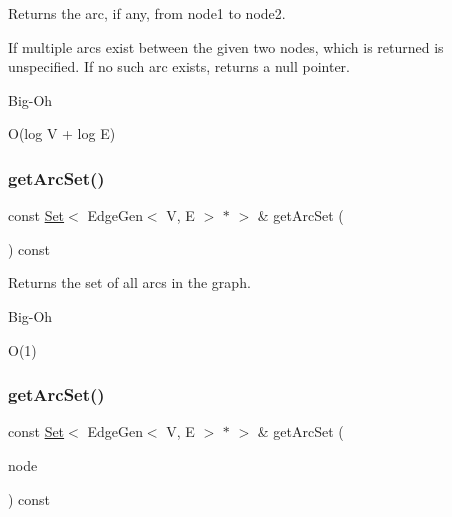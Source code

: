 Returns the arc, if any, from node1 to node2. 

If multiple arcs exist between the given two nodes, which is returned is unspecified. If no such arc exists, returns a null pointer. \begin{DoxyRefDesc}{Big-\/\+Oh}
\item[\mbox{\hyperlink{BigOh__BigOh000061}{Big-\/\+Oh}}]O(log V + log E) \end{DoxyRefDesc}
\mbox{\label{classGraph_a0690edaeae8d5256189ae2e8541788b5}} 
\subsubsection{\texorpdfstring{get\+Arc\+Set()}{getArcSet()}\hspace{0.1cm}{\footnotesize\ttfamily [1/3]}}
{\footnotesize\ttfamily const \mbox{\hyperlink{classstanfordcpplib_1_1collections_1_1GenericSet}{Set}}$<$ Edge\+Gen$<$ V, E $>$  $\ast$ $>$ \& get\+Arc\+Set (\begin{DoxyParamCaption}{ }\end{DoxyParamCaption}) const\hspace{0.3cm}{\ttfamily [inherited]}}



Returns the set of all arcs in the graph. 

\begin{DoxyRefDesc}{Big-\/\+Oh}
\item[\mbox{\hyperlink{BigOh__BigOh000062}{Big-\/\+Oh}}]O(1) \end{DoxyRefDesc}
\mbox{\label{classGraph_a17cfc7f4d8c738fc6f51813f50be6400}} 
\subsubsection{\texorpdfstring{get\+Arc\+Set()}{getArcSet()}\hspace{0.1cm}{\footnotesize\ttfamily [2/3]}}
{\footnotesize\ttfamily const \mbox{\hyperlink{classstanfordcpplib_1_1collections_1_1GenericSet}{Set}}$<$ Edge\+Gen$<$ V, E $>$  $\ast$ $>$ \& get\+Arc\+Set (\begin{DoxyParamCaption}\item[{\mbox{\hyperlink{classVertexGen}{Vertex\+Gen}}$<$ V, E $>$  $\ast$}]{node }\end{DoxyParamCaption}) const\hspace{0.3cm}{\ttfamily [inherited]}}



